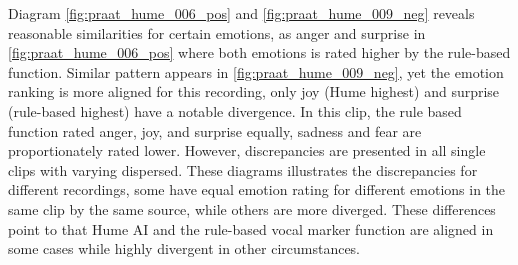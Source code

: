 Diagram \ref{fig:praat_hume_006_pos} and \ref{fig:praat_hume_009_neg} reveals reasonable similarities for certain emotions, as anger and surprise in \ref{fig:praat_hume_006_pos} where both emotions is rated higher by the rule-based function. Similar pattern appears in \ref{fig:praat_hume_009_neg}, yet the emotion ranking is more aligned for this recording, only joy (Hume highest) and surprise (rule-based highest) have a notable divergence. In this clip, the rule based function rated anger, joy, and surprise equally, sadness and fear are proportionately rated lower. 
However, discrepancies are presented in all single clips with varying dispersed. These diagrams illustrates the discrepancies for different recordings, some have equal emotion rating for different emotions in the same clip by the same source, while others are more diverged. These differences point to that Hume AI and the rule-based vocal marker function are aligned in some cases while highly divergent in other circumstances. 
    

